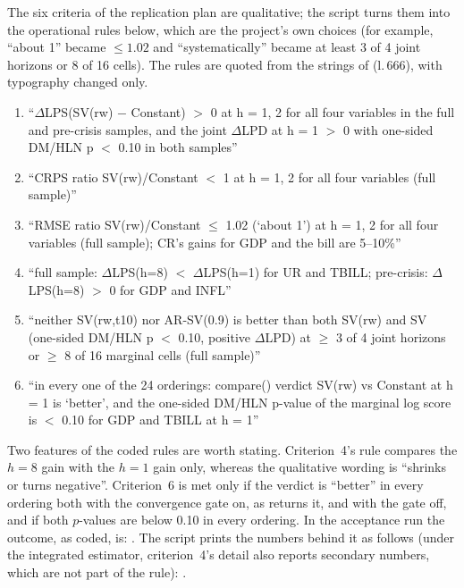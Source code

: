 The six criteria of the replication plan are qualitative; the script turns them into the operational
rules below, which are the project's own choices (for example, ``about 1'' became $\le 1.02$ and
``systematically'' became at least 3 of 4 joint horizons or 8 of 16 cells).
The rules are quoted from the  strings of  (l.\,666), with typography
changed only.
\begin{enumerate}
\item ``$\Delta$LPS(SV(rw) $-$ Constant) $>$ 0 at h = 1, 2 for all four variables in the full and
pre-crisis samples, and the joint $\Delta$LPD at h = 1 $>$ 0 with one-sided DM/HLN p $<$ 0.10 in both
samples''
\item ``CRPS ratio SV(rw)/Constant $<$ 1 at h = 1, 2 for all four variables (full sample)''
\item ``RMSE ratio SV(rw)/Constant $\le$ 1.02 (`about 1') at h = 1, 2 for all four variables (full
sample); CR's gains for GDP and the bill are 5--10\%''
\item ``full sample: $\Delta$LPS(h=8) $<$ $\Delta$LPS(h=1) for UR and TBILL; pre-crisis:
$\Delta$LPS(h=8) $>$ 0 for GDP and INFL''
\item ``neither SV(rw,t10) nor AR-SV(0.9) is better than both SV(rw) and SV (one-sided DM/HLN p $<$
0.10, positive $\Delta$LPD) at $\ge$ 3 of 4 joint horizons or $\ge$ 8 of 16 marginal cells (full
sample)''
\item ``in every one of the 24 orderings: compare() verdict SV(rw) vs Constant at h = 1 is `better',
and the one-sided DM/HLN p-value of the marginal log score is $<$ 0.10 for GDP and TBILL at h = 1''
\end{enumerate}
Two features of the coded rules are worth stating.
Criterion~4's rule compares the $h = 8$ gain with the $h = 1$ gain only, whereas the qualitative
wording is ``shrinks or turns negative''.
Criterion~6 is met only if the verdict is ``better'' in every ordering both with the convergence gate
on, as  returns it, and with the gate off, and if both $p$-values are below 0.10 in
every ordering.
In the acceptance run the outcome, as coded, is: . The script prints the
numbers behind it as follows (under the integrated estimator, criterion~4's detail also reports
secondary numbers, which are not part of the rule): .

